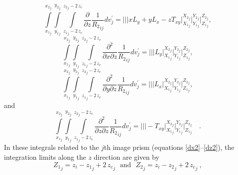 \documentclass[P]{BrJG_submit}
\begin{document}
\vspace{-0.5cm}
\begin{equation}
\int\limits_{{x_{1}}_{j}}^{{x_{2}}_{j}} \! 
\int\limits_{{y_{1}}_{j}}^{{y_{2}}_{j}} 
\int\limits_{{z_{1}}_{j} - 2 \, z_c}^{{z_{2}}_{j} - 2 \, z_c}
\! \! \! \! \! \! \! \! 
\frac{\partial }{\partial z} {\frac{1}{{R_2}_{ij}}} dv_{j}^{\prime} \! = \!
\Bigg|\Bigg|\Bigg|
x L_y  + y L_x -  z T_{xy} \!
\Bigg|_{{X_1}_{j}}^{{X_2}_{j}} \! \Bigg|_{{Y_1}_{j}}^{{Y_2}_{j}} \! \Bigg|_{{Z_1}_{j}}^{{Z_2}_{j}} ,
\label{dz2}
\end{equation}
\vspace{-0.5cm}
\begin{equation}
\int\limits_{{x_{1}}_{j}}^{{x_{2}}_{j}} \!
\int\limits_{{y_{1}}_{j}}^{{y_{2}}_{j}} 
\int\limits_{{z_{1}}_{j} - 2 \, z_c}^{{z_{2}}_{j} - 2 \, z_c}
\! \! \! \! \! \! \! \! 
\frac{\partial^{2}}{\partial x \partial z} {\frac{1}{{R_2}_{ij}}} dv_{j}^{\prime} \! = \!
\Bigg|\Bigg|\Bigg| 
L_y \!
\Bigg|_{{X_1}_{j}}^{{X_2}_{j}} \! \Bigg|_{{Y_1}_{j}}^{{Y_2}_{j}} \! \Bigg|_{{Z_1}_{j}}^{{Z_2}_{j}} ,
\label{dxz2}
\end{equation}
\begin{equation}
\int\limits_{{x_{1}}_{j}}^{{x_{2}}_{j}} \!
\int\limits_{{y_{1}}_{j}}^{{y_{2}}_{j}} 
\int\limits_{{z_{1}}_{j} - 2 \, z_c}^{{z_{2}}_{j} - 2 \, z_c}
\! \! \! \! \! \! \! \! 
\frac{\partial^{2}}{\partial y \partial z} {\frac{1}{{R_2}_{ij}}} dv_{j}^{\prime} \! = \!
\Bigg|\Bigg|\Bigg|
L_x \!
\Bigg|_{{X_1}_{j}}^{{X_2}_{j}} \! \Bigg|_{{Y_1}_{j}}^{{Y_2}_{j}} \! \Bigg|_{{Z_1}_{j}}^{{Z_2}_{j}} ,
\label{dyz2}
\end{equation}
and
\begin{equation}
\int\limits_{{x_{1}}_{j}}^{{x_{2}}_{j}} \!
\int\limits_{{y_{1}}_{j}}^{{y_{2}}_{j}} 
\int\limits_{{z_{1}}_{j} - 2 \, z_c}^{{z_{2}}_{j} - 2 \, z_c}
\! \! \! \! \! \! \! \! 
\frac{\partial^{2}}{\partial z \partial z} {\frac{1}{{R_2}_{ij}}} dv_{j}^{\prime} \! = \!
\Bigg|\Bigg|\Bigg|
-  T_{xy} 
\Bigg|_{{X_1}_{j}}^{{X_2}_{j}} \! \Bigg|_{{Y_1}_{j}}^{{Y_2}_{j}} \!  \Bigg|_{{Z_1}_{j}}^{{Z_2}_{j}} \quad .
\label{dzz2}
\end{equation}
In these integrals related to the $j$th image prism 
(equations \ref{dx2}--\ref{dz2}), the integration limits along the $z$ direction
are given by
\begin{equation}
{Z_1}_{j} = z_i - {z_1}_{j} + 2 \, {z_c}_{j} \:\: \: \textrm{and} \: \: \:
{Z_2}_{j} = z_i - {z_2}_{j} + 2 \, {z_c}_{j} \:,
\label{eq:Nagy_limits_2}
\end{equation}
\end{document}
